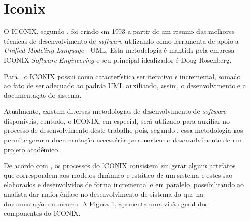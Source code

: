 \section{Iconix}

\par O ICONIX, segundo , foi criado em 1993 a partir de um resumo das melhores técnicas de desenvolvimento de \textit{software} utilizando como ferramenta de apoio a \textit{Unified Modeling Language} - UML\footnotemark[3]. Esta metodologia é mantida pela empresa ICONIX \textit{Software Engineering} e seu principal idealizador é Doug Rosenberg.



\par Para , o ICONIX possui como característica ser iterativo e incremental, somado ao fato de ser adequado ao padrão UML auxiliando, assim, o desenvolvimento e a documentação do sistema.

\par Atualmente, existem diversas metodologias de desenvolvimento de \textit{software} disponíveis, contudo, o ICONIX, em especial, será utilizado para auxiliar no processo de desenvolvimento deste trabalho pois, segundo
, essa metodologia nos permite gerar a documentação necessária para nortear o desenvolvimento de um projeto acadêmico.

\par De acordo com , os processos do ICONIX consistem em gerar alguns artefatos que correspondem aos modelos dinâmico e estático de um sistema e estes são elaborados e desenvolvidos de forma incremental e em paralelo, possibilitando ao analista dar maior ênfase no desenvolvimento do sistema do que na documentação do mesmo. A Figura 1, apresenta uma visão geral dos componentes do ICONIX.

